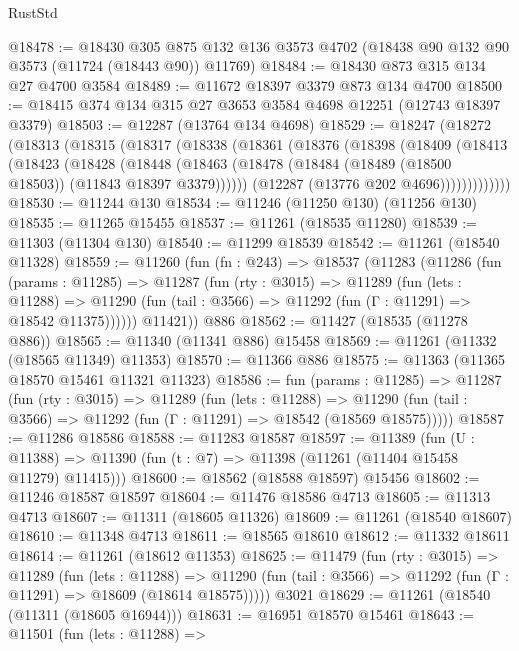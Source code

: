 \begin{lexlean}{RustStd}
\begin{coremodule}
@18478 := @18430
    @305
    @875
    @132
    @136
    @3573
    @4702
    (@18438 @90 @132 @90 @3573 (@11724 (@18443 @90)) @11769)
@18484 := @18430 @873 @315 @134 @27 @4700 @3584
@18489 := @11672 @18397 @3379 @873 @134 @4700
@18500 := @18415 @374 @134 @315 @27 @3653 @3584 @4698 @12251 (@12743 @18397 @3379)
@18503 := @12287 (@13764 @134 @4698)
@18529 := @18247
    (@18272
      (@18313
        (@18315
          (@18317
            (@18338
              (@18361
                (@18376
                  (@18398
                    (@18409
                      (@18413
                        (@18423
                          (@18428
                            (@18448
                              (@18463
                                (@18478 (@18484 (@18489 (@18500 @18503)) (@11843 @18397 @3379))))))
                          (@12287 (@13776 @202 @4696)))))))))))))
@18530 := @11244 @130
@18534 := @11246 (@11250 @130) (@11256 @130)
@18535 := @11265 @15455
@18537 := @11261 (@18535 @11280)
@18539 := @11303 (@11304 @130)
@18540 := @11299 @18539
@18542 := @11261 (@18540 @11328)
@18559 := @11260
    (fun (fn : @243) =>
    @18537
      (@11283
        (@11286
          (fun (params : @11285) =>
          @11287
            (fun (rty : @3015) =>
            @11289
              (fun (lets : @11288) =>
              @11290 (fun (tail : @3566) => @11292 (fun (Γ : @11291) => @18542 @11375))))))
        @11421))
    @886
@18562 := @11427 (@18535 (@11278 @886))
@18565 := @11340 (@11341 @886) @15458
@18569 := @11261 (@11332 (@18565 @11349) @11353)
@18570 := @11366 @886
@18575 := @11363 (@11365 @18570 @15461 @11321 @11323)
@18586 := fun (params : @11285) =>
  @11287
    (fun (rty : @3015) =>
    @11289
      (fun (lets : @11288) =>
      @11290 (fun (tail : @3566) => @11292 (fun (Γ : @11291) => @18542 (@18569 @18575)))))
@18587 := @11286 @18586
@18588 := @11283 @18587
@18597 := @11389
    (fun (U : @11388) => @11390 (fun (t : @7) => @11398 (@11261 (@11404 @15458 @11279) @11415)))
@18600 := @18562 (@18588 @18597) @15456
@18602 := @11246 @18587 @18597
@18604 := @11476 @18586 @4713
@18605 := @11313 @4713
@18607 := @11311 (@18605 @11326)
@18609 := @11261 (@18540 @18607)
@18610 := @11348 @4713
@18611 := @18565 @18610
@18612 := @11332 @18611
@18614 := @11261 (@18612 @11353)
@18625 := @11479
    (fun (rty : @3015) =>
    @11289
      (fun (lets : @11288) =>
      @11290 (fun (tail : @3566) => @11292 (fun (Γ : @11291) => @18609 (@18614 @18575)))))
    @3021
@18629 := @11261 (@18540 (@11311 (@18605 @16944)))
@18631 := @16951 @18570 @15461
@18643 := @11501
    (fun (lets : @11288) =>

\end{coremodule}
\end{lexlean}
